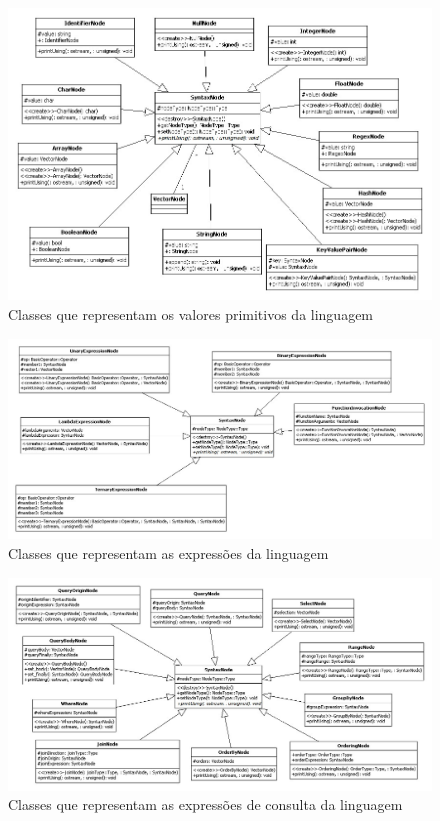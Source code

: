 \begin{figure}[!htp]
  \begin{center}
    \includegraphics[width=1\textwidth]{figuras/classes2}
  \end{center}
  \caption{Classes que representam os valores primitivos da linguagem}
  \label{fig:classes2}
\end{figure}

\begin{figure}[!htp]
  \begin{center}
    \includegraphics[width=1\textwidth]{figuras/classes3}
  \end{center}
  \caption{Classes que representam as express\~oes da linguagem}
  \label{fig:classes3}
\end{figure}

\begin{figure}[!htp]
  \begin{center}
    \includegraphics[width=1\textwidth]{figuras/classes4}
  \end{center}
  \caption{Classes que representam as express\~oes de consulta da linguagem}
  \label{fig:classes4}
\end{figure}

